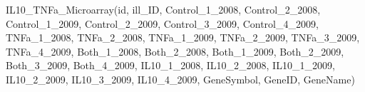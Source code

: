 \documentclass[letterpaper,10pt,english]{sphinxmanual}
\begin{document}
\begin{fulllineitems}
\label{api:experimentdb.datasets.models.IL10_TNFa_Microarray}
IL10\_TNFa\_Microarray(id, ill\_ID, Control\_1\_2008, Control\_2\_2008, Control\_1\_2009, Control\_2\_2009, Control\_3\_2009, Control\_4\_2009, TNFa\_1\_2008, TNFa\_2\_2008, TNFa\_1\_2009, TNFa\_2\_2009, TNFa\_3\_2009, TNFa\_4\_2009, Both\_1\_2008, Both\_2\_2008, Both\_1\_2009, Both\_2\_2009, Both\_3\_2009, Both\_4\_2009, IL10\_1\_2008, IL10\_2\_2008, IL10\_1\_2009, IL10\_2\_2009, IL10\_3\_2009, IL10\_4\_2009, GeneSymbol, GeneID, GeneName)

\begin{fulllineitems}
\label{api:experimentdb.datasets.models.IL10_TNFa_Microarray.DoesNotExist}
\end{fulllineitems}


\begin{fulllineitems}
\label{api:experimentdb.datasets.models.IL10_TNFa_Microarray.MultipleObjectsReturned}
\end{fulllineitems}


\end{fulllineitems}

\end{document}
